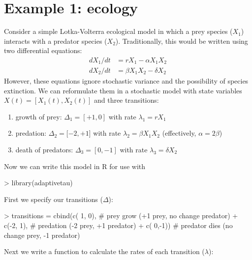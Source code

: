 \documentclass[11pt,nogin]{article}
\begin{document}
\section*{Example 1: ecology}
Consider a simple Lotka-Volterra ecological model in which a prey species ($X_{1}$) interacts with a predator species ($X_{2}$). Traditionally, this would be written using two differential equations:
\[
\begin{split}
  dX_{1}/dt & =rX_{1}-\alpha X_{1}X_{2}\\
  dX_{2}/dt & =\beta X_{1}X_{2}-\delta X_{2}
\end{split}
\]
However, these equations ignore stochastic variance and the possibility of species extinction. We can reformulate them in a stochastic model with state variables $X(t)=[X_{1}(t),X_{2}(t)]$ and three transitions:
\begin{enumerate}
\item growth of prey: $\Delta_{1}=[+1,0]$ with rate $\lambda_{1}=rX_{1}$
\item predation: $\Delta_{2}=[-2,+1${]} with rate $\lambda_{2}=\beta X_{1}X_{2}$
(effectively, $\alpha=2\beta$)
\item death of predators: $\Delta_{3}=[0,-1]$ with rate $\lambda_{3}=\delta X_{2}$
\end{enumerate}
Now we can write this model in R for use with
\begin{Schunk}
\begin{Sinput}
> library(adaptivetau)
\end{Sinput}
\end{Schunk}
First we specify our transitions ($\Delta$):
\begin{Schunk}
\begin{Sinput}
> transitions = cbind(c( 1, 0), # prey grow (+1 prey, no change predator)
+                     c(-2, 1), # predation (-2 prey, +1 predator)
+                     c( 0,-1)) # predator dies (no change prey, -1 predator)
\end{Sinput}
\end{Schunk}
Next we write a function to calculate the rates of each transition ($\lambda$):
\begin{Schunk}
\end{Schunk}
\end{document}
